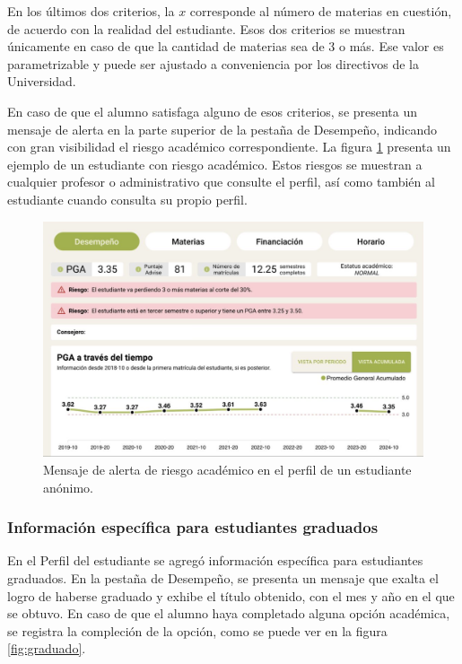 En los últimos dos criterios, la $x$ corresponde al número de materias en cuestión, de acuerdo con la realidad del estudiante. Esos dos criterios se muestran únicamente en caso de que la cantidad de materias sea de 3 o más. Ese valor es parametrizable y puede ser ajustado a conveniencia por los directivos de la Universidad.

En caso de que el alumno satisfaga alguno de esos criterios, se presenta un mensaje de alerta en la parte superior de la pestaña de Desempeño, indicando con gran visibilidad el riesgo académico correspondiente. La figura \ref{fig:riesgo_academico} presenta un ejemplo de un estudiante con riesgo académico. Estos riesgos se muestran a cualquier profesor o administrativo que consulte el perfil, así como también al estudiante cuando consulta su propio perfil.

\begin{figure}[H]
	\includegraphics[width=\textwidth]{assets/nes/riesgo_academico.png}
	\caption{Mensaje de alerta de riesgo académico en el perfil de un estudiante anónimo.}
	\label{fig:riesgo_academico}
\end{figure}

\subsubsection{Información específica para estudiantes graduados}

En el Perfil del estudiante se agregó información específica para estudiantes graduados. En la pestaña de Desempeño, se presenta un mensaje que exalta el logro de haberse graduado y exhibe el título obtenido, con el mes y año en el que se obtuvo. En caso de que el alumno haya completado alguna opción académica, se registra la compleción de la opción, como se puede ver en la figura \ref{fig:graduado}.

